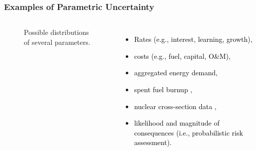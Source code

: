 \begin{frame}
    \frametitle{Examples of Parametric Uncertainty}

    \begin{columns}
        \column[t]{5cm}
        \begin{figure}
            \centering
            \resizebox{\columnwidth}{!}{
                
            }
            \caption{Possible distributions of several parameters.}
            \label{fig:multi-distributions}
        \end{figure}

        \column[t]{5cm}

        \begin{itemize}
            \item \textcolor{black}{Rates (e.g., interest, learning, growth),}
            \item \textcolor{black}{costs (e.g., fuel, capital, O\&M),}
            \item \textcolor{black}{aggregated energy demand,}
            \item \textcolor{black}{spent fuel burnup \cite{feng_sensitivity_2020},}
            \item \textcolor{black}{nuclear cross-section data \cite{eades_influence_2016,radaideh_combining_2019},}
            \item \textcolor{black}{likelihood and magnitude of consequences (i.e., probabilistic risk assessment).}
        \end{itemize}

    \end{columns}

\end{frame}


